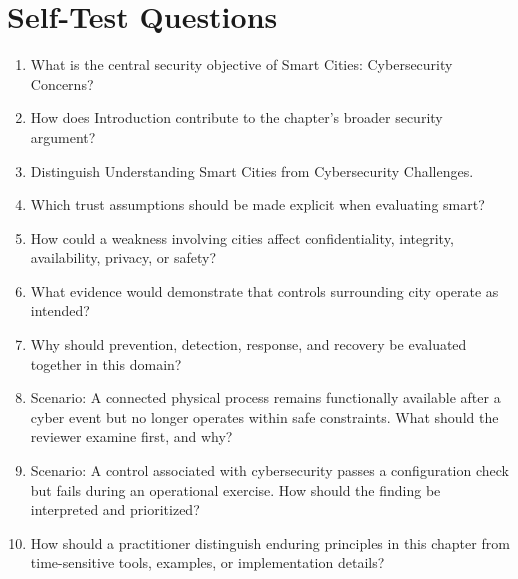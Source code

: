 \documentclass[11pt]{article}
\begin{document}
\section*{Self-Test Questions}
\begin{enumerate}
\item What is the central security objective of Smart Cities: Cybersecurity Concerns?
\item How does Introduction contribute to the chapter's broader security argument?
\item Distinguish Understanding Smart Cities from Cybersecurity Challenges.
\item Which trust assumptions should be made explicit when evaluating smart?
\item How could a weakness involving cities affect confidentiality, integrity, availability, privacy, or safety?
\item What evidence would demonstrate that controls surrounding city operate as intended?
\item Why should prevention, detection, response, and recovery be evaluated together in this domain?
\item Scenario: A connected physical process remains functionally available after a cyber event but no longer operates within safe constraints. What should the reviewer examine first, and why?
\item Scenario: A control associated with cybersecurity passes a configuration check but fails during an operational exercise. How should the finding be interpreted and prioritized?
\item How should a practitioner distinguish enduring principles in this chapter from time-sensitive tools, examples, or implementation details?
\end{enumerate}
\end{document}
